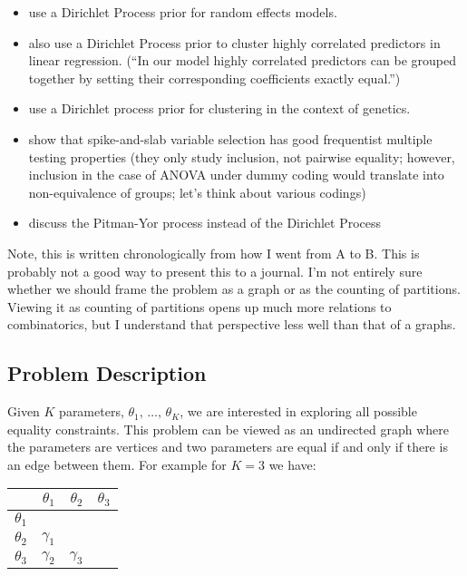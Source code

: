 \documentclass[]{article}
\newcommand{\bindicator}{\gamma}%
\begin{document}
\begin{itemize}
    \item \textcite{kim2009spiked} use a Dirichlet Process prior for random effects models.
    \item \textcite{curtis2011bayesian} also use a Dirichlet Process prior to cluster highly correlated predictors in linear regression. (``In our model highly correlated predictors can be grouped together by setting their corresponding coefficients exactly equal.'')
    \item \textcite{dunson2008bayesian} use a Dirichlet process prior for clustering in the context of genetics.
    \item \textcite{castillo2020spike} show that spike-and-slab variable selection has good frequentist multiple testing properties (they only study inclusion, not pairwise equality; however, inclusion in the case of ANOVA under dummy coding would translate into non-equivalence of groups; let's think about various codings)
    \item \textcite{canale2017pitman} discuss the Pitman-Yor process instead of the Dirichlet Process
\end{itemize}


Note, this is written chronologically from how I went from A to B. This is probably not a good way to present this to a journal.
I'm not entirely sure whether we should frame the problem as a graph or as the counting of partitions.
Viewing it as counting of partitions opens up much more relations to combinatorics, but I understand that perspective less well than that of a graphs.

\subsection*{Problem Description}
Given $K$ parameters, $\theta_1,\, \dots,\, \theta_K$, we are interested in exploring all possible equality constraints.
This problem can be viewed as an undirected graph where the parameters are vertices and two parameters are equal if and only if there is an edge between them.
For example for $K = 3$ we have:
\begin{table}[!ht]
	\centering
	\begin{tabular}{l|rrr}
					&	$\theta_1$	&	$\theta_2$	&	$\theta_3$	\\
		\hline
		$\theta_1$	&				&				&				\\
		$\theta_2$	&	$\bindicator_1$	&				&				\\
		$\theta_3$	&	$\bindicator_2$	&	$\bindicator_3$	&				\\
	\end{tabular}
\end{table}
\end{document}
